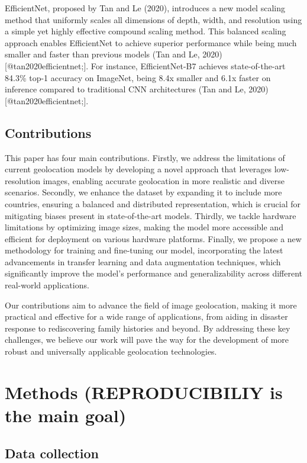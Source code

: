 \documentclass{article}
\begin{document}
EfficientNet, proposed by Tan and Le (2020), introduces a new model
scaling method that uniformly scales all dimensions of depth, width, and
resolution using a simple yet highly effective compound scaling method.
This balanced scaling approach enables EfficientNet to achieve superior
performance while being much smaller and faster than previous models
(Tan and Le, 2020) {[}@tan2020efficientnet;{]}. For instance,
EfficientNet-B7 achieves state-of-the-art 84.3\% top-1 accuracy on
ImageNet, being 8.4x smaller and 6.1x faster on inference compared to
traditional CNN architectures (Tan and Le, 2020)
{[}@tan2020efficientnet;{]}.

\subsection{Contributions}\label{contributions}

This paper has four main contributions. Firstly, we address the
limitations of current geolocation models by developing a novel approach
that leverages low-resolution images, enabling accurate geolocation in
more realistic and diverse scenarios. Secondly, we enhance the dataset
by expanding it to include more countries, ensuring a balanced and
distributed representation, which is crucial for mitigating biases
present in state-of-the-art models. Thirdly, we tackle hardware
limitations by optimizing image sizes, making the model more accessible
and efficient for deployment on various hardware platforms. Finally, we
propose a new methodology for training and fine-tuning our model,
incorporating the latest advancements in transfer learning and data
augmentation techniques, which significantly improve the model's
performance and generalizability across different real-world
applications.

Our contributions aim to advance the field of image geolocation, making
it more practical and effective for a wide range of applications, from
aiding in disaster response to rediscovering family histories and
beyond. By addressing these key challenges, we believe our work will
pave the way for the development of more robust and universally
applicable geolocation technologies.

\section{Methods (REPRODUCIBILIY is the main
goal)}\label{methods-reproducibiliy-is-the-main-goal}

\subsection{Data collection}\label{data-collection}
\end{document}
